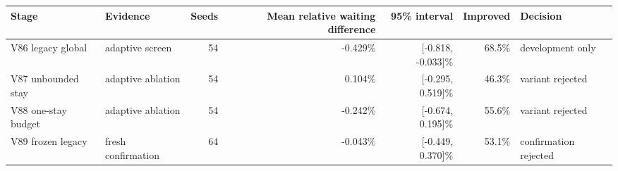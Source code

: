 \begin{tabular}{llrrrrl}
\toprule
Stage & Evidence & Seeds & Mean relative waiting difference & 95\% interval & Improved & Decision \\
\midrule
V86 legacy global & adaptive screen & 54 & -0.429\% & [-0.818, -0.033]\% & 68.5\% & development only \\
V87 unbounded stay & adaptive ablation & 54 & 0.104\% & [-0.295, 0.519]\% & 46.3\% & variant rejected \\
V88 one-stay budget & adaptive ablation & 54 & -0.242\% & [-0.674, 0.195]\% & 55.6\% & variant rejected \\
V89 frozen legacy & fresh confirmation & 64 & -0.043\% & [-0.449, 0.370]\% & 53.1\% & confirmation rejected \\
\bottomrule
\end{tabular}
